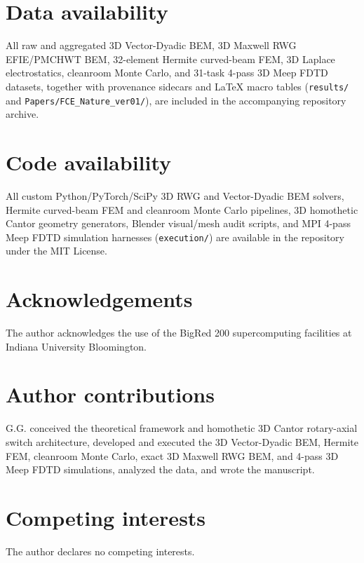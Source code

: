 \documentclass[pdflatex,sn-nature]{sn-jnl}
\begin{document}
\section*{Data availability}
All raw and aggregated 3D Vector-Dyadic BEM, 3D Maxwell RWG EFIE/PMCHWT BEM, 32-element Hermite curved-beam FEM, 3D Laplace electrostatics, cleanroom Monte Carlo, and 31-task 4-pass 3D Meep FDTD datasets, together with provenance sidecars and LaTeX macro tables (\texttt{results/} and \texttt{Papers/FCE\_Nature\_ver01/}), are included in the accompanying repository archive.

\section*{Code availability}
All custom Python/PyTorch/SciPy 3D RWG and Vector-Dyadic BEM solvers, Hermite curved-beam FEM and cleanroom Monte Carlo pipelines, 3D homothetic Cantor geometry generators, Blender visual/mesh audit scripts, and MPI 4-pass Meep FDTD simulation harnesses (\texttt{execution/}) are available in the repository under the MIT License.

\section*{Acknowledgements}
The author acknowledges the use of the BigRed 200 supercomputing facilities at Indiana University Bloomington.

\section*{Author contributions}
G.G. conceived the theoretical framework and homothetic 3D Cantor rotary-axial switch architecture, developed and executed the 3D Vector-Dyadic BEM, Hermite FEM, cleanroom Monte Carlo, exact 3D Maxwell RWG BEM, and 4-pass 3D Meep FDTD simulations, analyzed the data, and wrote the manuscript.

\section*{Competing interests}
The author declares no competing interests.



\clearpage
\renewcommand{\thefigure}{\arabic{figure}}
\renewcommand{\theHfigure}{ext.\arabic{figure}}
\renewcommand{\figurename}{Extended Data Fig.}
\setcounter{figure}{0}
\end{document}
